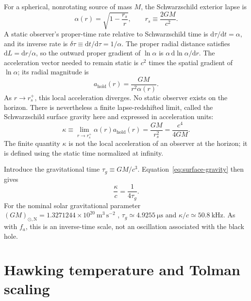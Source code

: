 \documentclass[12pt]{article}
\begin{document}
For a spherical, nonrotating source of mass $M$, the Schwarzschild exterior lapse is \cite{Schwarzschild}
\begin{equation}
  \alpha(r)=\sqrt{1-\frac{r_s}{r}},
  \qquad
  r_s\equiv\frac{2GM}{c^2}.
  \label{eq:schwarzschild-lapse}
\end{equation}
A static observer's proper-time rate relative to Schwarzschild time is $\mathrm{d}\tau/\mathrm{d}t=\alpha$, and its inverse rate is $\delta\tau\equiv\mathrm{d}t/\mathrm{d}\tau=1/\alpha$. The proper radial distance satisfies $\mathrm{d}L=\mathrm{d}r/\alpha$, so the outward proper gradient of $\ln\alpha$ is $\alpha\,\mathrm{d}\ln\alpha/\mathrm{d}r$. The acceleration vector needed to remain static is $c^2$ times the spatial gradient of $\ln\alpha$; its radial magnitude is
\begin{equation}
  a_{\mathrm{hold}}(r)
  =\frac{GM}{r^2\alpha(r)}.
  \label{eq:hover-acceleration}
\end{equation}
As $r\to r_s^+$, this local acceleration diverges. No static observer exists on the horizon. There is nevertheless a finite lapse-redshifted limit, called the Schwarzschild surface gravity here and expressed in acceleration units:
\begin{equation}
  \kappa\equiv\lim_{r\to r_s^+}\alpha(r)a_{\mathrm{hold}}(r)
  =\frac{GM}{r_s^2}
  =\frac{c^4}{4GM}.
  \label{eq:surface-gravity}
\end{equation}
The finite quantity $\kappa$ is not the local acceleration of an observer at the horizon; it is defined using the static time normalized at infinity.

Introduce the gravitational time $\tau_g\equiv GM/c^3$. Equation~\eqref{eq:surface-gravity} then gives
\begin{equation}
  \frac{\kappa}{c}=\frac{1}{4\tau_g}.
  \label{eq:kappa-frequency}
\end{equation}
For the nominal solar gravitational parameter $(GM)_{\odot,\mathrm{N}}=1.3271244\times10^{20}\ \mathrm{m^3\,s^{-2}}$ \cite{Prsa}, $\tau_g\simeq4.9255\ \mathrm{\mu s}$ and $\kappa/c\simeq50.8\ \mathrm{kHz}$. As with $f_a$, this is an inverse-time scale, not an oscillation associated with the black hole.

\section{Hawking temperature and Tolman scaling}
\end{document}
